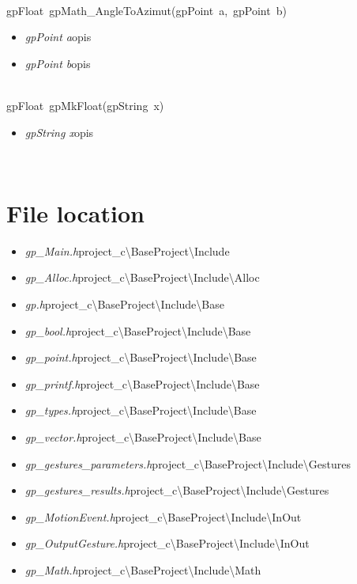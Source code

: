  \ \\
\mbox{\textsf{gpFloat gpMath_AngleToAzimut(gpPoint a, gpPoint b)}}
	\begin{itemize}
		\item \textit{gpPoint a}\quad opis
		\item \textit{gpPoint b}\quad opis
	\end{itemize}

 \ \\
\mbox{\textsf{gpFloat gpMkFloat(gpString x)}}
	\begin{itemize}
		\item \textit{gpString x}\quad opis
	\end{itemize}

 \ \\

\section{File location}
\begin{itemize}
\item \textit{gp_Main.h}\quad project_c\textbackslash BaseProject\textbackslash Include
\item \textit{gp_Alloc.h}\quad project_c\textbackslash BaseProject\textbackslash Include\textbackslash Alloc
\item \textit{gp.h}\quad project_c\textbackslash BaseProject\textbackslash Include\textbackslash Base
\item \textit{gp_bool.h}\quad project_c\textbackslash BaseProject\textbackslash Include\textbackslash Base
\item \textit{gp_point.h}\quad project_c\textbackslash BaseProject\textbackslash Include\textbackslash Base
\item \textit{gp_printf.h}\quad project_c\textbackslash BaseProject\textbackslash Include\textbackslash Base
\item \textit{gp_types.h}\quad project_c\textbackslash BaseProject\textbackslash Include\textbackslash Base
\item \textit{gp_vector.h}\quad project_c\textbackslash BaseProject\textbackslash Include\textbackslash Base
\item \textit{gp_gestures_parameters.h}\quad project_c\textbackslash BaseProject\textbackslash Include\textbackslash Gestures
\item \textit{gp_gestures_results.h}\quad project_c\textbackslash BaseProject\textbackslash Include\textbackslash Gestures
\item \textit{gp_MotionEvent.h}\quad project_c\textbackslash BaseProject\textbackslash Include\textbackslash InOut
\item \textit{gp_OutputGesture.h}\quad project_c\textbackslash BaseProject\textbackslash Include\textbackslash InOut
\item \textit{gp_Math.h}\quad project_c\textbackslash BaseProject\textbackslash Include\textbackslash Math
\end{itemize}
